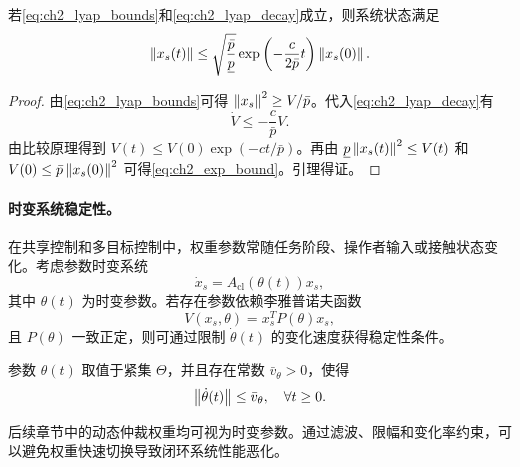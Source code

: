 \begin{lemma}[二次型李雅普诺夫函数的指数界]
\label{lem:ch2_exp_bound}
若\eqref{eq:ch2_lyap_bounds}和\eqref{eq:ch2_lyap_decay}成立，则系统状态满足
\begin{equation}
  \left\lVert x_s(t)\right\rVert\le \sqrt{\frac{\bar p}{\underline p}}\exp\left(-\frac{c}{2\bar p}t\right)\left\lVert x_s(0)\right\rVert .
  \label{eq:ch2_exp_bound}
\end{equation}
\end{lemma}

\begin{proof}
由\eqref{eq:ch2_lyap_bounds}可得 $\left\lVert x_s\right\rVert^2\ge V/\bar p$。代入\eqref{eq:ch2_lyap_decay}有
\begin{equation}
  \dot V\le -\frac{c}{\bar p}V .
\end{equation}
由比较原理得到 $V(t)\le V(0)\exp(-ct/\bar p)$。再由 $\underline p\left\lVert x_s(t)\right\rVert^2\le V(t)$ 和 $V(0)\le\bar p\left\lVert x_s(0)\right\rVert^2$ 可得\eqref{eq:ch2_exp_bound}。引理得证。
\end{proof}

\paragraph{时变系统稳定性。}
\label{subsec:ch2_time_varying}

在共享控制和多目标控制中，权重参数常随任务阶段、操作者输入或接触状态变化。考虑参数时变系统
\begin{equation}
  \dot x_s=A_{\mathrm{cl}}(\theta(t))x_s,
  \label{eq:ch2_timevarying_system}
\end{equation}
其中 $\theta(t)$ 为时变参数。若存在参数依赖李雅普诺夫函数
\begin{equation}
  V(x_s,\theta)=x_s^TP(\theta)x_s,
  \label{eq:ch2_param_lyap}
\end{equation}
且 $P(\theta)$ 一致正定，则可通过限制 $\dot\theta(t)$ 的变化速度获得稳定性条件。

\begin{assumption}[时变参数的有界变化]
\label{ass:ch2_slow_varying}
参数 $\theta(t)$ 取值于紧集 $\Theta$，并且存在常数 $\bar v_\theta>0$，使得
\begin{equation}
  \left\lVert \dot\theta(t)\right\rVert\le \bar v_\theta,
  \quad \forall t\ge0 .
\end{equation}
\end{assumption}

\begin{remark}
后续章节中的动态仲裁权重均可视为时变参数。通过滤波、限幅和变化率约束，可以避免权重快速切换导致闭环系统性能恶化。
\end{remark}

